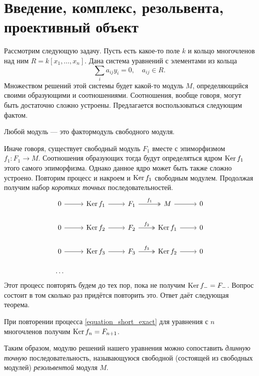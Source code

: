 \documentclass[../hw_main.tex]{subfiles}
\begin{document}
\section{Введение, комплекс, резольвента, проективный объект}
Рассмотрим следующую задачу. Пусть есть какое-то поле $k$ и кольцо многочленов над ним $R=k[x_1, \ldots, x_n]$. Дана система уравнений с элементами из кольца
\begin{equation*}
    \sum_i a_{ij}y_i = 0, \quad a_{ij}\in R.
\end{equation*}
Множеством решений этой системы будет какой-то модуль $M$, определяющийся своими образующими и соотношениями. Соотношения, вообще говоря, могут быть достаточно сложно устроены. Предлагается воспользоваться следующим фактом.
\begin{to_suj}\label{free_factor}
Любой модуль --- это фактормодуль свободного модуля.
\end{to_suj}
Иначе говоря, существует свободный модуль $F_1$ вместе с эпиморфизмом $f_1:F_1\to M$. Соотношения образующих тогда будут определяться ядром $\mathop{\mathrm{Ker}}\nolimits f_1$ этого самого эпиморфизма. Однако данное ядро может быть также сложно устроено. Повторим процесс и накроем и $\mathop{\mathrm{Ker}}\nolimits f_1$ свободным модулем. Продолжая получим набор \emph{коротких точных} последовательностей.
\begin{equation}\label{equation_short_exact}
\begin{tikzcd}
	0 & {\Ker f_1} & {F_1} & M & 0 \\
	0 & {\Ker f_2} & {F_2} & {\Ker f_1} & 0 \\
	0 & {\Ker f_3} & {F_3} & {\Ker f_2} & 0 \\
	\ldots & {} & {}
	\arrow[from=1-4, to=1-5]
	\arrow["{f_1}", two heads, from=1-3, to=1-4]
	\arrow[from=1-2, to=1-3]
	\arrow[from=2-4, to=2-5]
	\arrow["{f_2}", two heads, from=2-3, to=2-4]
	\arrow[from=2-2, to=2-3]
	\arrow[from=3-4, to=3-5]
	\arrow["{f_3}", two heads, from=3-3, to=3-4]
	\arrow[from=3-2, to=3-3]
	\arrow[from=3-1, to=3-2]
	\arrow[from=2-1, to=2-2]
	\arrow[from=1-1, to=1-2]
\end{tikzcd}
\end{equation}
Этот процесс повторять будем до тех пор, пока не получим $\mathop{\mathrm{Ker}}\nolimits f_- = F_-$. Вопрос состоит в том сколько раз придётся повторить это. Ответ даёт следующая теорема.
\begin{to_thr}
При повторении процесса \eqref{equation_short_exact} для уравнения с $n$ многочленов получим $\mathop{\mathrm{Ker}}\nolimits f_n = F_{n+1}$.
\end{to_thr}
Таким образом, модулю решений нашего уравнения можно сопоставить \emph{длинную точную} последовательность, называющуюся свободной (состоящей из свободных модулей) \emph{резольвентой} модуля $M$.
\end{document}
